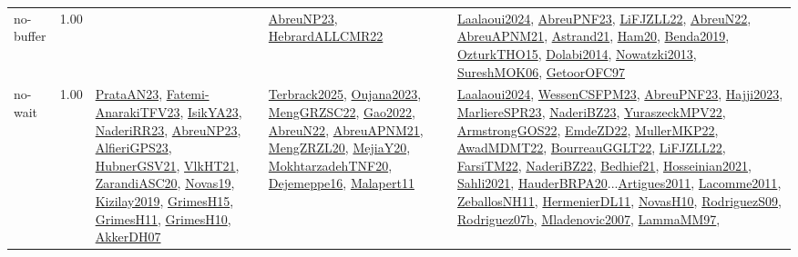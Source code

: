 {\begin{longtable}{p{3cm}r>{\raggedright\arraybackslash}p{6cm}>{\raggedright\arraybackslash}p{6cm}>{\raggedright\arraybackslash}p{8cm}}
\index{no-buffer}\index{Concepts!no-buffer}no-buffer &  1.00 &  & \hyperref[detail:AbreuNP23]{AbreuNP23}, \hyperref[detail:HebrardALLCMR22]{HebrardALLCMR22} & \hyperref[detail:Laalaoui2024]{Laalaoui2024}, \hyperref[detail:AbreuPNF23]{AbreuPNF23}, \hyperref[detail:LiFJZLL22]{LiFJZLL22}, \hyperref[detail:AbreuN22]{AbreuN22}, \hyperref[detail:AbreuAPNM21]{AbreuAPNM21}, \hyperref[detail:Astrand21]{Astrand21}, \hyperref[detail:Ham20]{Ham20}, \hyperref[detail:Benda2019]{Benda2019}, \hyperref[detail:OzturkTHO15]{OzturkTHO15}, \hyperref[detail:Dolabi2014]{Dolabi2014}, \hyperref[detail:Nowatzki2013]{Nowatzki2013}, \hyperref[detail:SureshMOK06]{SureshMOK06}, \hyperref[detail:GetoorOFC97]{GetoorOFC97}\\
\index{no-wait}\index{Concepts!no-wait}no-wait &  1.00 & \hyperref[detail:PrataAN23]{PrataAN23}, \hyperref[detail:Fatemi-AnarakiTFV23]{Fatemi-AnarakiTFV23}, \hyperref[detail:IsikYA23]{IsikYA23}, \hyperref[detail:NaderiRR23]{NaderiRR23}, \hyperref[detail:AbreuNP23]{AbreuNP23}, \hyperref[detail:AlfieriGPS23]{AlfieriGPS23}, \hyperref[detail:HubnerGSV21]{HubnerGSV21}, \hyperref[detail:VlkHT21]{VlkHT21}, \hyperref[detail:ZarandiASC20]{ZarandiASC20}, \hyperref[detail:Novas19]{Novas19}, \hyperref[detail:Kizilay2019]{Kizilay2019}, \hyperref[detail:GrimesH15]{GrimesH15}, \hyperref[detail:GrimesH11]{GrimesH11}, \hyperref[detail:GrimesH10]{GrimesH10}, \hyperref[detail:AkkerDH07]{AkkerDH07} & \hyperref[detail:Terbrack2025]{Terbrack2025}, \hyperref[detail:Oujana2023]{Oujana2023}, \hyperref[detail:MengGRZSC22]{MengGRZSC22}, \hyperref[detail:Gao2022]{Gao2022}, \hyperref[detail:AbreuN22]{AbreuN22}, \hyperref[detail:AbreuAPNM21]{AbreuAPNM21}, \hyperref[detail:MengZRZL20]{MengZRZL20}, \hyperref[detail:MejiaY20]{MejiaY20}, \hyperref[detail:MokhtarzadehTNF20]{MokhtarzadehTNF20}, \hyperref[detail:Dejemeppe16]{Dejemeppe16}, \hyperref[detail:Malapert11]{Malapert11} & \hyperref[detail:Laalaoui2024]{Laalaoui2024}, \hyperref[detail:WessenCSFPM23]{WessenCSFPM23}, \hyperref[detail:AbreuPNF23]{AbreuPNF23}, \hyperref[detail:Hajji2023]{Hajji2023}, \hyperref[detail:MarliereSPR23]{MarliereSPR23}, \hyperref[detail:NaderiBZ23]{NaderiBZ23}, \hyperref[detail:YuraszeckMPV22]{YuraszeckMPV22}, \hyperref[detail:ArmstrongGOS22]{ArmstrongGOS22}, \hyperref[detail:EmdeZD22]{EmdeZD22}, \hyperref[detail:MullerMKP22]{MullerMKP22}, \hyperref[detail:AwadMDMT22]{AwadMDMT22}, \hyperref[detail:BourreauGGLT22]{BourreauGGLT22}, \hyperref[detail:LiFJZLL22]{LiFJZLL22}, \hyperref[detail:FarsiTM22]{FarsiTM22}, \hyperref[detail:NaderiBZ22]{NaderiBZ22}, \hyperref[detail:Bedhief21]{Bedhief21}, \hyperref[detail:Hosseinian2021]{Hosseinian2021}, \hyperref[detail:Sahli2021]{Sahli2021}, \hyperref[detail:HauderBRPA20]{HauderBRPA20}...\hyperref[detail:Artigues2011]{Artigues2011}, \hyperref[detail:Lacomme2011]{Lacomme2011}, \hyperref[detail:ZeballosNH11]{ZeballosNH11}, \hyperref[detail:HermenierDL11]{HermenierDL11}, \hyperref[detail:NovasH10]{NovasH10}, \hyperref[detail:RodriguezS09]{RodriguezS09}, \hyperref[detail:Rodriguez07b]{Rodriguez07b}, \hyperref[detail:Mladenovic2007]{Mladenovic2007}, \hyperref[detail:LammaMM97]{LammaMM97}, 
\end{longtable}}
